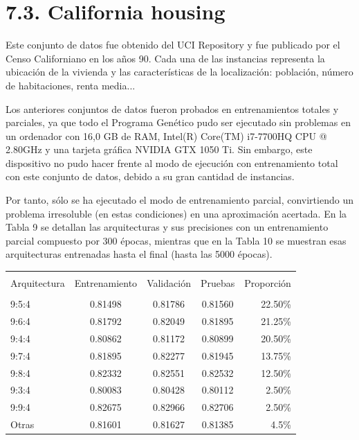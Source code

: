 \documentclass[spanish,a4paper,12pt,twoside]{report}
\begin{document}
  \section*{\Large 7.3. California housing}
  Este conjunto de datos fue obtenido del UCI Repository y fue publicado por el Censo Californiano en los años 90. Cada una de las instancias representa la ubicación de la vivienda y las características de la localización: población, número de habitaciones, renta media... \par
  Los anteriores conjuntos de datos fueron probados en entrenamientos totales y parciales, ya que todo el Programa Genético pudo ser ejecutado sin problemas en un ordenador con 16,0 GB de RAM, Intel(R) Core(TM) i7-7700HQ CPU @ 2.80GHz y una tarjeta gráfica NVIDIA GTX 1050 Ti. Sin embargo, este dispositivo no pudo hacer frente al modo de ejecución con entrenamiento total con este conjunto de datos, debido a su gran cantidad de instancias. \par
  Por tanto, sólo se ha ejecutado el modo de entrenamiento parcial, convirtiendo un problema irresoluble (en estas condiciones) en una aproximación acertada. En la Tabla 9 se detallan las arquitecturas y sus precisiones con un entrenamiento parcial compuesto por 300 épocas, mientras que en la Tabla 10 se muestran esas arquitecturas entrenadas hasta el final (hasta las 5000 épocas).
\begin{center}
   \label{table}
  \begin{tabular}{l c c c r}
    \hline \\ [-2ex]
    Arquitectura & Entrenamiento & Validación & Pruebas & Proporción \\ [0.5ex]
    \hline \\ [-1ex]
    9:5:4 & 0.81498 & 0.81786 & 0.81560 & 22.50\% \\
    9:6:4 & 0.81792 & 0.82049 & 0.81895 & 21.25\% \\
    9:4:4 & 0.80862 & 0.81172 & 0.80899 & 20.50\% \\
    9:7:4 & 0.81895 & 0.82277 & 0.81945 & 13.75\% \\
    9:8:4 & 0.82332 & 0.82551 & 0.82532 & 12.50\% \\
    9:3:4 & 0.80083 & 0.80428 & 0.80112 & 2.50\% \\
    9:9:4 & 0.82675 & 0.82966 & 0.82706 & 2.50\% \\
    Otras & 0.81601 & 0.81627 & 0.81385 & 4.5\% \\ [1ex]
    \hline
  \end{tabular}
\end{center} \par
\end{document}

